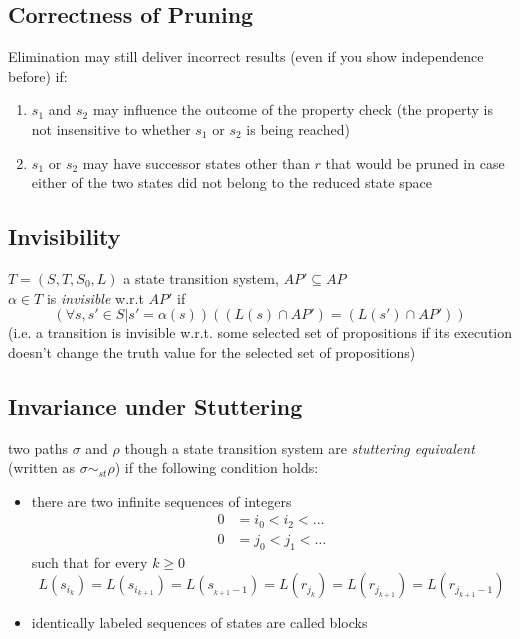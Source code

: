 \documentclass[a4paper, 10pt]{article}
\begin{document}
\subsection*{Correctness of Pruning}
Elimination may still deliver incorrect results (even if you show independence before) if:
\begin{enumerate}
    \item $s_1$ and $s_2$ may influence the outcome of the property check {\tiny (the property is not insensitive to whether $s_1$ or $s_2$ is being reached)}
    \item $s_1$ or $s_2$ may have successor states other than $r$ that would be pruned in case either of the two states did not belong to the reduced state space
\end{enumerate}
\subsection{Invisibility}
\begin{shaded}
    $T=(S,T,S_0,L)$ a state transition system, $AP'\subseteq AP$ \\
    $\alpha\in T$ is \emph{invisible} w.r.t $AP'$ if
    \[ (\forall s,s'\in S| s'=\alpha(s))((L(s)\cap AP')=(L(s')\cap AP')) \]
    {\tiny (i.e. a transition is invisible w.r.t. some selected set of propositions if its execution doesn't change the truth value for the selected set of propositions)}
\end{shaded}
\subsection{Invariance under Stuttering}
\begin{shaded}
    two paths $\sigma$ and $\rho$ though a state transition system are \emph{stuttering equivalent} (written as $\sigma\sim_{st}\rho$) if the following condition holds:
    \begin{itemize}
        \item there are two infinite sequences of integers
        \begin{align*}
        0&=i_0<i_2<\dots \\
        0&=j_0<j_1<\dots
        \end{align*}
        such that for every $k\geq0$
        \[ L(s_{i_k})=L(s_{i_{k+1}})=L(s_{_{k+1}-1})=L(r_{j_k})=L(r_{j_{k+1}})=L(r_{j_{k+1}-1}) \]
        \item identically labeled sequences of states are called blocks
        \begin{center}
        \scalebox{1}{}
        \end{center}
    \end{itemize}
\end{shaded}
\end{document}
